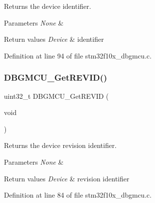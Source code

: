 Returns the device identifier. 


\begin{DoxyParams}{Parameters}
{\em None} & \\
\hline
\end{DoxyParams}

\begin{DoxyRetVals}{Return values}
{\em Device} & identifier \\
\hline
\end{DoxyRetVals}


Definition at line 94 of file stm32f10x\+\_\+dbgmcu.\+c.

\mbox{\label{group___d_b_g_m_c_u___private___functions_ga47419e9ca75ab7be4c70feb82faa0511}} 
\subsubsection{\texorpdfstring{D\+B\+G\+M\+C\+U\+\_\+\+Get\+R\+E\+V\+I\+D()}{DBGMCU\_GetREVID()}}
{\footnotesize\ttfamily uint32\+\_\+t D\+B\+G\+M\+C\+U\+\_\+\+Get\+R\+E\+V\+ID (\begin{DoxyParamCaption}\item[{void}]{ }\end{DoxyParamCaption})}



Returns the device revision identifier. 


\begin{DoxyParams}{Parameters}
{\em None} & \\
\hline
\end{DoxyParams}

\begin{DoxyRetVals}{Return values}
{\em Device} & revision identifier \\
\hline
\end{DoxyRetVals}


Definition at line 84 of file stm32f10x\+\_\+dbgmcu.\+c.

